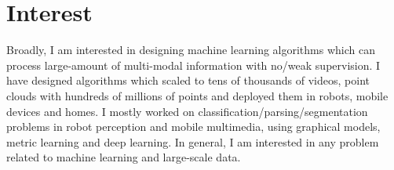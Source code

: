     \section{\mysidestyle \textcolor{olgray}{Interest}}
Broadly, I am interested in designing machine learning algorithms which can process large-amount of multi-modal information with no/weak supervision.  I have designed algorithms which scaled to tens of thousands of videos, point clouds with hundreds of millions of points and deployed them in robots, mobile devices and homes. I mostly worked on classification/parsing/segmentation problems in robot perception and mobile multimedia, using graphical models, metric learning and deep learning. In general, I am interested in any problem related to machine learning and large-scale data.